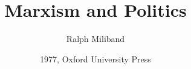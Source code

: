 \documentclass[12pt,legalpaper]{report}
\title{Marxism and Politics}
\author{Ralph Miliband}
\date{1977, Oxford University Press}
\begin{document}
\maketitle











\tableofcontents



\renewcommand{\thesection}{\Roman{section}}
















\end{document}
